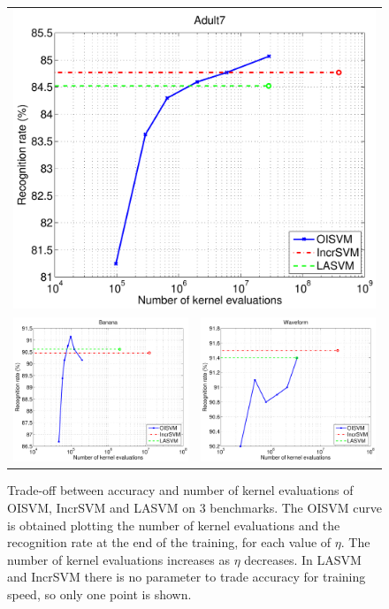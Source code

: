 \begin{figure}[!ht]
  \centering \footnotesize
  \begin{tabular}{cc}
  \multicolumn{2}{c}{\includegraphics[width=0.48\linewidth]{figs/results/fig_a7a}} \\
  \includegraphics[width=0.48\linewidth]{figs/results/fig_banana} &
  \includegraphics[width=0.48\linewidth]{figs/results/fig_waveform}
  \end{tabular}
  \caption{Trade-off between accuracy and number of kernel evaluations of OISVM, IncrSVM and
  LASVM on 3 benchmarks.
  The OISVM curve is obtained plotting the number of kernel evaluations and the recognition rate at the end of the training, for each value of $\eta$. The number of kernel evaluations increases as $\eta$ decreases. 
  In LASVM and IncrSVM there is no parameter to trade accuracy for training speed, so only one
  point is shown.}
\label{fig:kernel_eval}
\end{figure}
